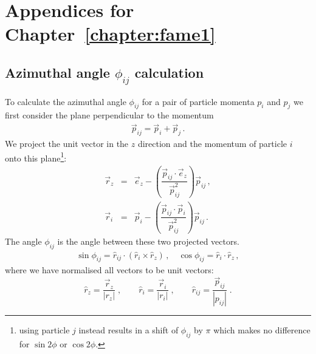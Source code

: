 \documentclass[main.tex]{subfiles}
\begin{document}
\chapter{Appendices for Chapter~\ref{chapter:fame1}}
\label{appendix:fame1}

\section{Azimuthal angle $\phi_{ij}$ calculation}\label{appendix:fame1_phi}
To calculate the azimuthal angle $\phi_{ij}$ for a pair of particle momenta $p_i$ 
and $p_j$ we first consider the plane perpendicular to the momentum 
\begin{eqnarray}\label{eq:pij}
    \vec{p}_{ij} = \vec{p}_{i} + \vec{p}_{j} \, .
\end{eqnarray}
We project the unit vector in the $z$ direction and the momentum of particle $i$ onto 
this plane\footnote{using particle $j$ instead results in a shift of $\phi_{ij}$ by 
$\pi$ which makes no difference for $\sin2\phi$ or $\cos2\phi$.}: 
\begin{eqnarray}\label{eq:north_east}
    \vec{r}_{z} &=& \vec{e}_{z} - \left(\dfrac{\vec{p}_{ij} \cdot \vec{e}_{z}}{\vec{p}_{ij}^{2}}\right) \vec{p}_{ij} \, , \\
    \vec{r}_{i} &=& \vec{p}_{i} - \left(\dfrac{\vec{p}_{ij} \cdot \vec{p}_{i}}{\vec{p}_{ij}^{2}}\right) \vec{p}_{ij} \,.
\end{eqnarray}
The angle $\phi_{ij}$ is the angle between these two projected vectors.
\begin{eqnarray}\label{eq:sin_cos}
    \sin{\phi_{ij}} = 
    \hat r_{ij}\cdot\left( \hat{r}_{i} \times \hat{r}_{z} \right)\, , \quad \cos{\phi_{ij}} = \hat{r}_{i} \cdot \hat{r}_{z} \, ,
\end{eqnarray}
where we have normalised all vectors to be unit vectors:
\begin{equation}
\hat r_z = \frac{\vec{r}_z}{|r_z|}\;, \qquad \hat r_i = \frac{\vec{r}_i}{|r_i|}\;, \qquad \hat r_{ij} = \frac{\vec{p}_{ij}}{|p_{ij}|}\;.
\end{equation}
\end{document}
